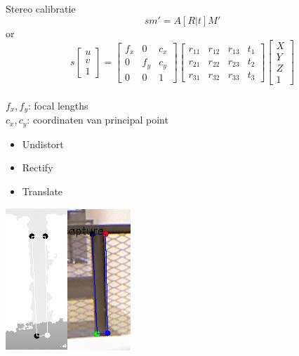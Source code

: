 \documentclass{beamer}
\begin{document}
\begin{frame}{Stereo calibratie}
{
\[
s m' = A \left[R|t\right]M'
\]
or
\[
s 
\left[ \begin{array}{c} 
u\\
v\\
1  
\end{array} \right]
=
\left[ \begin{array}{ccc} 
f_x & 0 & c_x\\
0 & f_y & c_y\\
0 & 0 & 1  
\end{array} \right]
\left[ \begin{array}{cccc}
r_{11} & r_{12} & r_{13} & t_1\\
r_{21} & r_{22} & r_{23} & t_2\\
r_{31} & r_{32} & r_{33} & t_3
\end{array} \right]
\left[ \begin{array}{c} 
X\\
Y\\
Z\\
1  
\end{array} \right]
\]\\
$f_{x},f_{y}$: focal lengths\\
$c_x,c_y$: coordinaten van principal point
}
{
\begin{itemize}
\item Undistort
\item Rectify
\item Translate
\end{itemize}
\centerline{\includegraphics[scale=0.4]{rectify.jpg}}
}
\end{frame}
\end{document}

